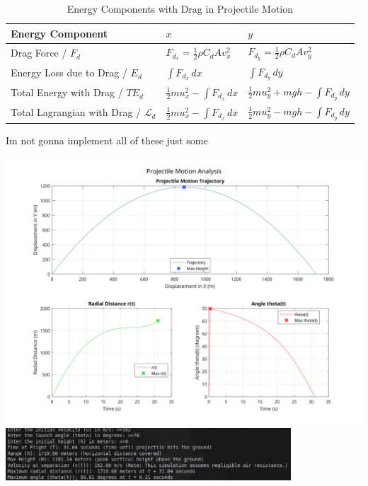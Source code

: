 \documentclass[a4paper, 12pt]{report}
\def\link{blue!50!black}
\begin{document}
        \begin{table}[H]
            \centering
            \begin{tabular}{|>{\centering\arraybackslash}p{}|>{\centering\arraybackslash}p{}|>{\centering\arraybackslash}p{}|}
                \hline
                Energy Component & $x$ & $y$ \\ \hline
                Drag Force / $F_d$ & $F_{d_x} = \frac{1}{2} \rho C_d A v_x^2$ & $F_{d_y} = \frac{1}{2} \rho C_d A v_y^2$ \\ \hline
                Energy Loss due to Drag / $E_d$ & $\int F_{d_x} \, dx$ & $\int F_{d_y} \, dy$ \\ \hline
                Total Energy with Drag / $TE_d$ & $\frac{1}{2}m u_x^2 - \int F_{d_x} \, dx$ & $\frac{1}{2}m u_y^2 + mgh - \int F_{d_y} \, dy$ \\ \hline
                Total Lagrangian with Drag / $\mathscr{L}_d$ & $\frac{1}{2}m u_x^2 - \int F_{d_x} \, dx$ & $\frac{1}{2}m u_y^2 - mgh - \int F_{d_y} \, dy$ \\ \hline
            \end{tabular}
            \caption{Energy Components with Drag in Projectile Motion}
            \label{tab:drag_energy}
        \end{table}
    Im not gonna implement all of these just some
    

    \includegraphics[width=1\textwidth]{images/Projectile_motion.png}
    \includegraphics[width=0.8\textwidth]{images/q5.png}
    
\end{document}
